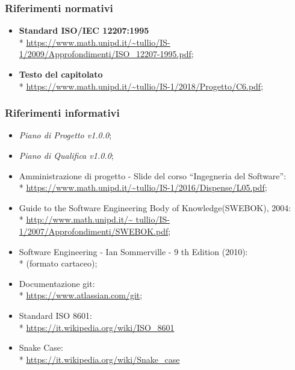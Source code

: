 \subsubsection{Riferimenti normativi}
\begin{itemize}
	\item \textbf{Standard ISO/IEC 12207:1995} \\* 
		\url{https://www.math.unipd.it/~tullio/IS-1/2009/Approfondimenti/ISO_12207-1995.pdf};
	\item \textbf{Testo del capitolato} \\*  
		\url{https://www.math.unipd.it/~tullio/IS-1/2018/Progetto/C6.pdf};
\end{itemize}

\subsubsection{Riferimenti informativi}
\begin{itemize}
	\item \textit{Piano di Progetto v1.0.0};
	\item \textit{Piano di Qualifica v1.0.0};
	\item Amministrazione di progetto - Slide del corso “Ingegneria del
		Software”: \\*
		\url{https://www.math.unipd.it/~tullio/IS-1/2016/Dispense/L05.pdf};
	\item Guide to the Software Engineering Body of Knowledge(SWEBOK), 2004: \\*
		\url{http://www.math.unipd.it/~	tullio/IS-1/2007/Approfondimenti/SWEBOK.pdf};
	\item Software Engineering - Ian Sommerville - 9 th Edition (2010): \\*
		(formato cartaceo);
	\item Documentazione git: \\*
		\url{https://www.atlassian.com/git};
	\item Standard ISO 8601: \\*
		\url{https://it.wikipedia.org/wiki/ISO_8601}
	\item Snake Case: \\*
	\url{https://it.wikipedia.org/wiki/Snake_case}	
	
\end{itemize}
